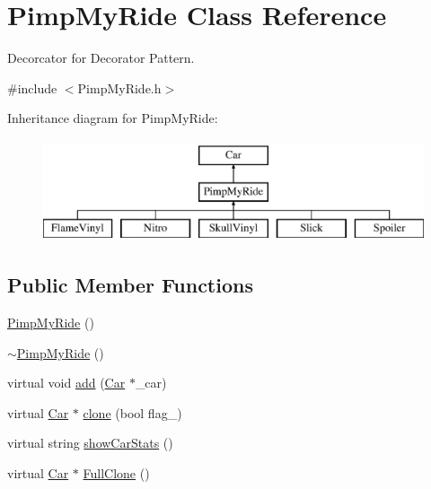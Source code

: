 \hypertarget{class_pimp_my_ride}{}\section{Pimp\+My\+Ride Class Reference}
\label{class_pimp_my_ride}


Decorcator for Decorator Pattern.  




{\ttfamily \#include $<$Pimp\+My\+Ride.\+h$>$}

Inheritance diagram for Pimp\+My\+Ride\+:\begin{figure}[H]
\begin{center}
\leavevmode
\includegraphics[height=3.000000cm]{class_pimp_my_ride}
\end{center}
\end{figure}
\subsection*{Public Member Functions}
\begin{DoxyCompactItemize}
\item 
\mbox{\hyperlink{class_pimp_my_ride_a8f900ee31c2c6a36492f39c82bdd64fc}{Pimp\+My\+Ride}} ()
\item 
\mbox{\hyperlink{class_pimp_my_ride_a891c6679516029bccdac908a09754935}{$\sim$\+Pimp\+My\+Ride}} ()
\item 
virtual void \mbox{\hyperlink{class_pimp_my_ride_a2293a4df894794145696d7610efe3056}{add}} (\mbox{\hyperlink{class_car}{Car}} $\ast$\+\_\+car)
\item 
virtual \mbox{\hyperlink{class_car}{Car}} $\ast$ \mbox{\hyperlink{class_pimp_my_ride_a37648eb844eb3e5967d0d3a6a8f0469d}{clone}} (bool flag\+\_\+)
\item 
virtual string \mbox{\hyperlink{class_pimp_my_ride_afd1a51b17959c3476d2ead62325d026e}{show\+Car\+Stats}} ()
\item 
virtual \mbox{\hyperlink{class_car}{Car}} $\ast$ \mbox{\hyperlink{class_pimp_my_ride_afce12a1a761727eebec707924521d0e2}{Full\+Clone}} ()
\end{DoxyCompactItemize}
